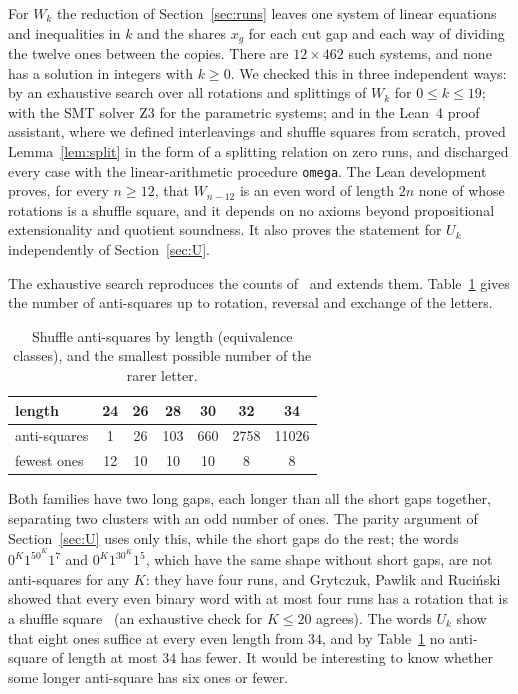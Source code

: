 \documentclass[12pt]{article}
\newcommand{\zz}[1]{0^{#1}}
\begin{document}
For $W_k$ the reduction of Section~\ref{sec:runs} leaves one system of linear equations and inequalities in
$k$ and the shares $x_g$ for each cut gap and each way of dividing the twelve ones between the copies. There
are $12 \times 462$ such systems, and none has a solution in integers with $k \ge 0$. We checked this
in three independent ways: by an exhaustive search over all rotations and splittings of $W_k$ for
$0 \le k \le 19$; with the SMT solver Z3 for the parametric systems; and in the Lean~4 proof assistant, where
we defined interleavings and shuffle squares from scratch, proved Lemma~\ref{lem:split} in the form of a
splitting relation on zero runs, and discharged every case with the linear-arithmetic procedure \texttt{omega}.
The Lean development proves, for every $n \ge 12$, that $W_{n-12}$ is an even word of length $2n$ none of whose
rotations is a shuffle square, and it depends on no axioms beyond propositional extensionality and quotient
soundness. It also proves the statement for $U_k$ independently of Section~\ref{sec:U}.

The exhaustive search reproduces the counts of~\cite{GPP} and extends them. Table~\ref{tab:counts} gives the
number of anti-squares up to rotation, reversal and exchange of the letters.

\begin{table}[h]
\centering
\begin{tabular}{lcccccc}
\toprule
length & 24 & 26 & 28 & 30 & 32 & 34 \\
\midrule
anti-squares & 1 & 26 & 103 & 660 & 2758 & 11026 \\
fewest ones & 12 & 10 & 10 & 10 & 8 & 8 \\
\bottomrule
\end{tabular}
\caption{Shuffle anti-squares by length (equivalence classes), and the smallest possible number of the rarer
letter.}\label{tab:counts}
\end{table}

\begin{remark}\label{rem:shape}
Both families have two long gaps, each longer than all the short gaps together, separating two clusters with an
odd number of ones. The parity argument of Section~\ref{sec:U} uses only this, while the short gaps do the rest;
the words $\zz{K}1^5\zz{K}1^7$ and $\zz{K}1^3\zz{K}1^5$, which have the same shape without short gaps, are not
anti-squares for any $K$: they have four runs, and Grytczuk, Pawlik and Ruci\'nski showed that every even
binary word with at most four runs has a rotation that is a shuffle square~\cite[Proposition~2 and Remark~1]{GPR}
(an exhaustive check for $K \le 20$ agrees). The words $U_k$ show that eight ones suffice at every even length
from $34$, and by Table~\ref{tab:counts} no anti-square of length at most $34$ has fewer. It would be
interesting to know whether some longer anti-square has six ones or fewer.
\end{remark}
\end{document}
